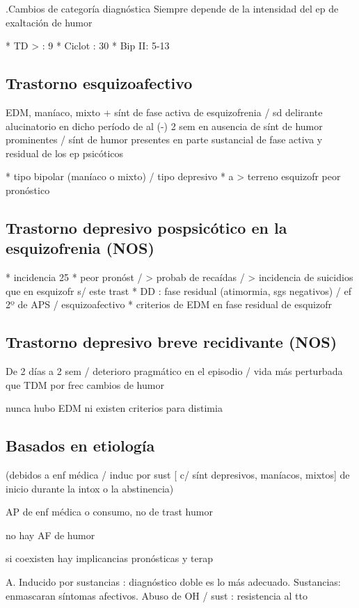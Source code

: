 .Cambios de categoría diagnóstica
Siempre depende de la intensidad del ep de exaltación de humor

* TD > : 9%
* Ciclot : 30%
* Bip II: 5-13%

\subsection*{Trastorno esquizoafectivo}
EDM, maníaco, mixto + sínt de fase activa de esquizofrenia / sd delirante alucinatorio en dicho período de al (-) 2 sem en ausencia de sínt de humor prominentes / sínt de humor presentes en parte sustancial de fase activa y residual de los ep psicóticos

* tipo bipolar (maníaco o mixto) / tipo depresivo
* a > terreno esquizofr peor pronóstico

\subsection*{Trastorno depresivo pospsicótico en la esquizofrenia (NOS)}
* incidencia 25%
* peor pronóst / > probab de recaídas / > incidencia de suicidios que en esquizofr s/ este trast
* DD : fase residual (atimormia, sgs negativos) / ef 2º de APS / esquizoafectivo
* criterios de EDM en fase residual de esquizofr
\subsection*{Trastorno depresivo breve recidivante (NOS)}
De 2 días a 2 sem / deterioro pragmático en el episodio / vida más perturbada que TDM por frec cambios de humor

nunca hubo EDM ni existen criterios para distimia

\subsection*{Basados en etiología}

(debidos a enf médica / induc por sust [ c/ sínt depresivos, maníacos, mixtos] de inicio durante la intox o la abstinencia)

AP de enf médica o consumo, no de trast humor

no hay AF de humor

si coexisten hay implicancias pronósticas y terap

A. Inducido por sustancias : diagnóstico doble es lo más adecuado.
Sustancias: enmascaran síntomas afectivos.
Abuso de OH / sust : resistencia al tto

